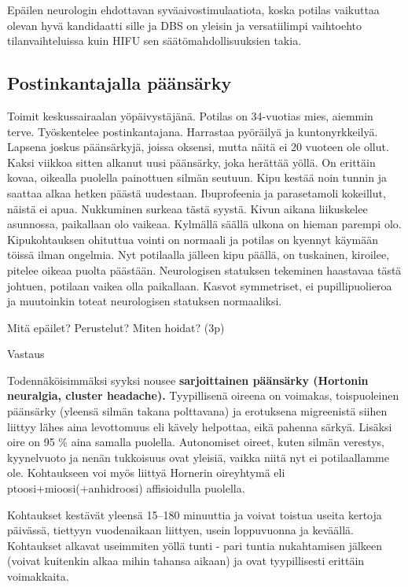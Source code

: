 \documentclass[
]{book}
\begin{document}
Epäilen neurologin ehdottavan syväaivostimulaatiota, koska potilas vaikuttaa olevan hyvä kandidaatti sille ja DBS on yleisin ja versatiilimpi vaihtoehto tilanvaihteluissa kuin HIFU sen säätömahdollisuuksien takia.

\subsection{Postinkantajalla päänsärky}\label{postinkantajalla-puxe4uxe4nsuxe4rky}

Toimit keskussairaalan yöpäivystäjänä. Potilas on 34-vuotias mies, aiemmin terve. Työskentelee postinkantajana. Harrastaa pyöräilyä ja kuntonyrkkeilyä. Lapsena joskus päänsärkyjä, joissa oksensi, mutta näitä ei 20 vuoteen ole ollut. Kaksi viikkoa sitten alkanut uusi päänsärky, joka herättää yöllä. On erittäin kovaa, oikealla puolella painottuen silmän seutuun. Kipu kestää noin tunnin ja saattaa alkaa hetken päästä uudestaan. Ibuprofeenia ja parasetamoli kokeillut, näistä ei apua. Nukkuminen surkeaa tästä syystä. Kivun aikana liikuskelee asunnossa, paikallaan olo vaikeaa. Kylmällä säällä ulkona on hieman parempi olo. Kipukohtauksen ohituttua vointi on normaali ja potilas on kyennyt käymään töissä ilman ongelmia. Nyt potilaalla jälleen kipu päällä, on tuskainen, kiroilee, pitelee oikeaa puolta päästään. Neurologisen statuksen tekeminen haastavaa tästä johtuen, potilaan vaikea olla paikallaan. Kasvot symmetriset, ei pupillipuolieroa ja muutoinkin toteat neurologisen statuksen normaaliksi.

Mitä epäilet? Perustelut? Miten hoidat? (3p)

Vastaus

Todennäköisimmäksi syyksi nousee \textbf{sarjoittainen päänsärky (Hortonin neuralgia, cluster headache).} Tyypillisenä oireena on voimakas, toispuoleinen päänsärky (yleensä silmän takana polttavana) ja erotuksena migreenistä siihen liittyy lähes aina levottomuus eli kävely helpottaa, eikä pahenna särkyä. Lisäksi oire on 95 \% aina samalla puolella. Autonomiset oireet, kuten silmän verestys, kyynelvuoto ja nenän tukkoisuus ovat yleisiä, vaikka niitä nyt ei potilaallamme ole. Kohtaukseen voi myös liittyä Hornerin oireyhtymä eli ptoosi+mioosi(+anhidroosi) affisioidulla puolella.

Kohtaukset kestävät yleensä 15--180 minuuttia ja voivat toistua useita kertoja päivässä, tiettyyn vuodenaikaan liittyen, usein loppuvuonna ja keväällä. Kohtaukset alkavat useimmiten yöllä tunti - pari tuntia nukahtamisen jälkeen (voivat kuitenkin alkaa mihin tahansa aikaan) ja ovat tyypillisesti erittäin voimakkaita.
\end{document}
